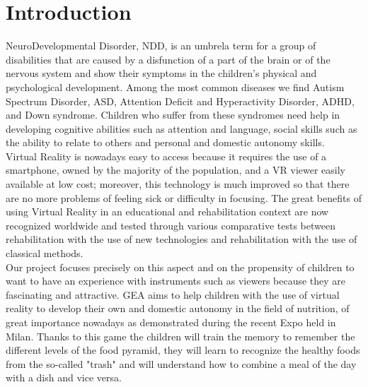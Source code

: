 \documentclass{sigchi-ext}
\begin{document}
\section{Introduction}
NeuroDevelopmental Disorder, NDD, is an umbrela term for a group of disabilities that are caused by a disfunction of a part of the brain or of the nervous system and show their symptoms in the children's physical and psychological development. Among the most common diseases we find Autism Spectrum Disorder, ASD, Attention Deficit and Hyperactivity Disorder, ADHD, and Down syndrome. Children who suffer from these syndromes need help in developing cognitive abilities such as attention and language, social skills such as the ability to relate to others and personal and domestic autonomy skills.\\
\medskip
 Virtual Reality is nowadays easy to access because it requires the use of a smartphone, owned by the majority of the population, and a VR viewer easily available at low cost; moreover, this technology is much improved so that there are no more problems of feeling sick or difficulty in focusing. The great benefits of using Virtual Reality in an educational and rehabilitation context are now recognized worldwide and tested through various comparative tests between rehabilitation with the use of new technologies and rehabilitation with the use of classical methods.\\
\medskip
  Our project focuses precisely on this aspect and on the propensity of children to want to have an experience with instruments such as viewers because they are fascinating and attractive. GEA aims to help children with the use of virtual reality to develop their own and domestic autonomy in the field of nutrition, of great importance nowadays as demonstrated during the recent Expo held in Milan. Thanks to this game the children will train the memory to remember the different levels of the food pyramid, they will learn to recognize the healthy foods from the so-called "trash" and will understand how to combine a meal of the day with a dish and vice versa.

    
\end{document}
